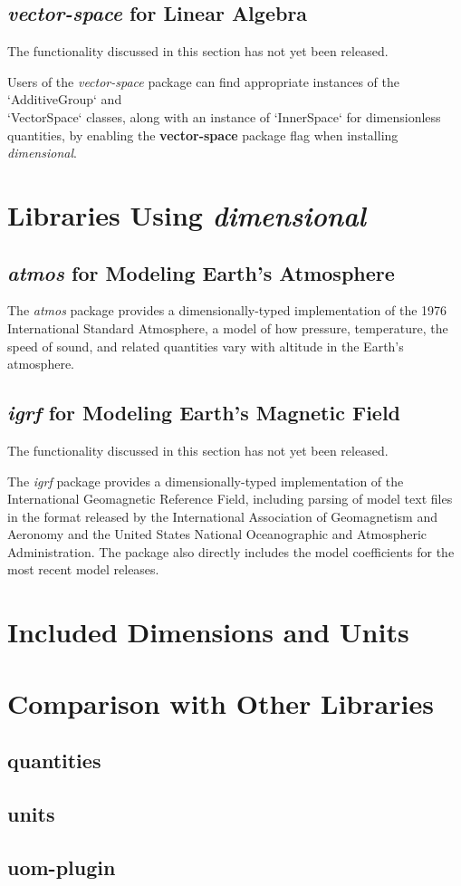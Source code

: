 \documentclass[11pt]{report}
\newcommand{\packagename}[1]{\textit{#1}}
\newcommand{\thispackage}{\packagename{dimensional}}
\newcommand{\flag}[1]{\textbf{#1}}
\newcommand{\prerelease}{\begin{framed}
The functionality discussed in this section has not yet been released.
\end{framed}}
\begin{document}
\section{\packagename{vector-space} for Linear Algebra}

\prerelease{}

Users of the \packagename{vector-space} package can find appropriate instances of the `AdditiveGroup` and \\
`VectorSpace` classes, along with an instance of `InnerSpace` for dimensionless quantities, by enabling the \flag{vector-space}
package flag when installing \thispackage{}.

\chapter{Libraries Using \thispackage}

\section{\packagename{atmos} for Modeling Earth's Atmosphere}

The \packagename{atmos} package provides a dimensionally-typed implementation of the 1976 International Standard
Atmosphere, a model of how pressure, temperature, the speed of sound, and related quantities vary with
altitude in the Earth's atmosphere.

\section{\packagename{igrf} for Modeling Earth's Magnetic Field}

\prerelease{}

The \packagename{igrf} package provides a dimensionally-typed implementation of the International Geomagnetic
Reference Field, including parsing of model text files in the format released by the International Association of
Geomagnetism and Aeronomy and the United States National Oceanographic and Atmospheric Administration. The
package also directly includes the model coefficients for the most recent model releases.

\chapter{Included Dimensions and Units}

\chapter{Comparison with Other Libraries}

\section{quantities}
\section{units}
\section{uom-plugin}
\end{document}
